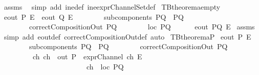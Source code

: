 \begin{isabellebody}
\ assms\ \isamarkupfalse%
\ {\isacharparenleft}simp\ add{\isacharcolon}\ ine{\isacharunderscore}def\ ine{\isacharunderscore}exprChannelSet{\isacharunderscore}def{\isacharparenright}%
\endisatagproof
{\isafoldproof}%
%
\isadelimproof
\isanewline
%
\endisadelimproof
\isanewline
{}\isamarkupfalse%
\ TBtheorem{}a{\isacharunderscore}empty{\isacharcolon}\isanewline
{}\ {\isachardoublequoteopen}{\isacharparenleft}eout\ P\ E{\isacharparenright}\ {\isasymor}\ {\isacharparenleft}eout\ Q\ E{\isacharparenright}{\isachardoublequoteclose}\isanewline
\ \ \ \ \ \ \ \ {\isachardoublequoteopen}subcomponents\ PQ\ {\isacharequal}\ {\isacharbraceleft}P{\isacharcomma}Q{\isacharbraceright}{\isachardoublequoteclose}\isanewline
\ \ \ \ \ \ \ \ {\isachardoublequoteopen}correctCompositionOut\ PQ{\isachardoublequoteclose}\isanewline
\ \ \ \ \ \ \ \ {\isachardoublequoteopen}loc\ PQ\ {\isacharequal}\ {\isacharbraceleft}{\isacharbraceright}{\isachardoublequoteclose}\isanewline
{}\ \ \ \ {\isachardoublequoteopen}eout\ PQ\ E{\isachardoublequoteclose}\isanewline
%
\isadelimproof
%
\endisadelimproof
%
\isatagproof
{}\isamarkupfalse%
\ assms\ \isamarkupfalse%
\ {\isacharparenleft}simp\ add{\isacharcolon}\ eout{\isacharunderscore}def\ correctCompositionOut{\isacharunderscore}def{\isacharcomma}\ auto{\isacharparenright}%
\endisatagproof
{\isafoldproof}%
%
\isadelimproof
\isanewline
%
\endisadelimproof
\isanewline
{}\isamarkupfalse%
\ TBtheorem{}{}a{\isacharunderscore}P{\isacharcolon}\isanewline
{}\ {\isachardoublequoteopen}eout\ P\ E{\isachardoublequoteclose}\isanewline
\ \ \ \ \ \ \ \ {\isachardoublequoteopen}subcomponents\ PQ\ {\isacharequal}\ {\isacharbraceleft}P{\isacharcomma}Q{\isacharbraceright}{\isachardoublequoteclose}\isanewline
\ \ \ \ \ \ \ \ {\isachardoublequoteopen}correctCompositionOut\ PQ{\isachardoublequoteclose}\isanewline
\ \ \ \ \ \ \ \ {\isachardoublequoteopen}{\isasymexists}\ ch{\isachardot}\ {\isacharparenleft}{\isacharparenleft}ch\ {\isasymin}\ {\isacharparenleft}out\ P{\isacharparenright}{\isacharparenright}\ {\isasymand}\ {\isacharparenleft}exprChannel\ ch\ E{\isacharparenright}\ {\isasymand}\ \isanewline
\ \ \ \ \ \ \ \ \ \ \ \ \ \ \ \ \ \ \ \ \ \ \ \ {\isacharparenleft}ch\ {\isasymnotin}\ {\isacharparenleft}loc\ PQ{\isacharparenright}{\isacharparenright}{\isacharparenright}{\isachardoublequoteclose}\isanewline

\end{isabellebody}
